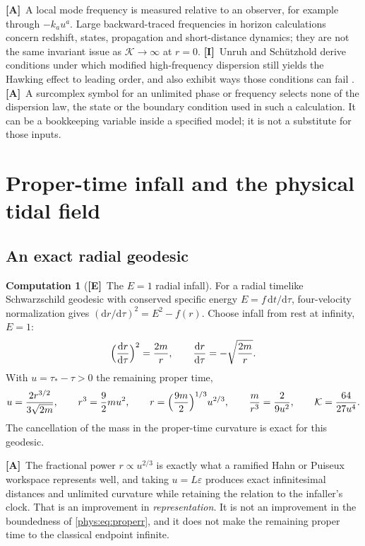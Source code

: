 \documentclass[11pt,letterpaper]{article}
\numberwithin{equation}{section}
\theoremstyle{definition}
\newtheorem{computation}[theorem]{Computation}
\theoremstyle{remark}
\newcommand{\eps}{\varepsilon}
\newcommand{\Kret}{\mathcal K}
\newcommand{\dd}{\mathrm d}
\newcommand{\TE}{\textcolor{TierE}{\textsf{\bfseries[E]}}}
\newcommand{\TA}{\textcolor{TierA}{\textsf{\bfseries[A]}}}
\newcommand{\TI}{\textcolor{TierI}{\textsf{\bfseries[I]}}}
\begin{document}
\TA\ A local mode frequency is measured relative to an observer, for example
through $-k_{a}u^{a}$. Large backward-traced frequencies in horizon
calculations concern redshift, states, propagation and short-distance dynamics;
they are not the same invariant issue as $\Kret\to\infty$ at $r=0$.
\TI\ Unruh and Sch\"utzhold derive conditions under which modified
high-frequency dispersion still yields the Hawking effect to leading order, and
also exhibit ways those conditions can fail \cite{phys:Unruh}. \TA\ A
surcomplex symbol for an unlimited phase or frequency selects none of the
dispersion law, the state or the boundary condition used in such a calculation.
It can be a bookkeeping variable inside a specified model; it is not a
substitute for those inputs.

\section{Proper-time infall and the physical tidal field}
\label{phys:sec:infall}

\subsection{An exact radial geodesic}
\label{phys:sub:radial}

\begin{computation}[\TE\ The $E=1$ radial infall]
\label{phys:comp:infall}
For a radial timelike Schwarzschild geodesic with conserved specific energy
$E=f\,\dd t/\dd\tau$, four-velocity normalization gives
$(\dd r/\dd\tau)^{2}=E^{2}-f(r)$. Choose infall from rest at infinity, $E=1$:
\begin{equation}\label{phys:eq:infall}
\Bigl(\frac{\dd r}{\dd\tau}\Bigr)^{2}=\frac{2m}{r},
\qquad
\frac{\dd r}{\dd\tau}=-\sqrt{\frac{2m}{r}}.
\end{equation}
With $u=\tau_{*}-\tau>0$ the remaining proper time,
\begin{equation}\label{phys:eq:properr}
u=\frac{2r^{3/2}}{3\sqrt{2m}},\qquad
r^{3}=\frac92 m u^{2},\qquad
r=\Bigl(\frac{9m}{2}\Bigr)^{1/3}u^{2/3},\qquad
\frac{m}{r^{3}}=\frac{2}{9u^{2}},\qquad
\Kret=\frac{64}{27u^{4}}.
\end{equation}
The cancellation of the mass in the proper-time curvature is exact for this
geodesic.
\end{computation}

\TA\ The fractional power $r\propto u^{2/3}$ is exactly what a ramified Hahn or
Puiseux workspace represents well, and taking $u=L\eps$ produces exact
infinitesimal distances and unlimited curvature while retaining the relation to
the infaller's clock. That is an improvement in \emph{representation}. It is
not an improvement in the boundedness of \eqref{phys:eq:properr}, and it does
not make the remaining proper time to the classical endpoint infinite.
\end{document}
